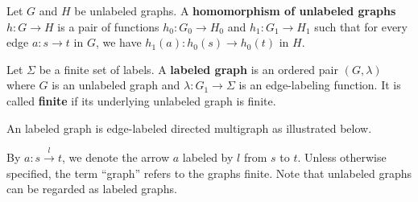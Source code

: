     \begin{definition}
        \label{def:unlabeled_graph:homomorphism}
        Let \( G \) and \( H \) be unlabeled graphs. A \textbf{homomorphism of unlabeled graphs} $h: G \mathop{\to} H$ is a pair of functions $h_0: G_0 \mathop{\to} H_0 $ and $h_1: G_1 \mathop{\to} H_1$ such that for every edge \( a: s \mathop{\to} t \) in \( G \), we have \( h_1(a) : h_0(s) \mathop{\to} h_0(t) \) in \( H \).
    \end{definition}
    \begin{definition}
        \label{def:graph}
        Let \(\Sigma\) be a finite set of labels. A \textbf{labeled graph} is an ordered pair \((G,\lambda)\) where \( G \) is an unlabeled graph and \( \lambda : G_1 \mathop{\rightarrow} \Sigma\) is an edge-labeling function. 
        It is called \textbf{finite} if its underlying unlabeled graph is finite.  
    \end{definition}
    \begin{example} An labeled graph is edge-labeled directed multigraph as illustrated below.
       
        \begin{center}
      \end{center} 
    \end{example}
    By $a : s\overset{l}{\rightarrow} t$, we denote the arrow $a$ labeled by $l$ from $s$ to $t$. Unless otherwise specified, the term \enquote{graph} refers to the graphs finite. Note that unlabeled graphs can be regarded as labeled graphs. 

